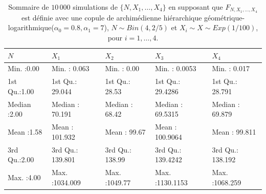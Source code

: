 \documentclass{article}
\begin{document}
	\begin{table}[H]
		\centering
		\begin{tabular}{lllll}
			\hline
			       $N$ &       $X_1$ &       $X_2$ &       $X_3$ &       $X_4$ \\ 
			\hline
			 Min.   :0.00   & Min.   :   0.063   & Min.   :   0.00   & Min.   :   0.0053   & Min.   :   0.017   \\ 
			 1st Qu.:1.00   & 1st Qu.:  29.044   & 1st Qu.:  28.53   & 1st Qu.:  29.4286   & 1st Qu.:  28.791   \\ 
			 Median :2.00   & Median :  70.191   & Median :  68.42   & Median :  69.5315   & Median :  69.879   \\ 
			 Mean   :1.58   & Mean   : 101.932   & Mean   :  99.67   & Mean   : 100.9064   & Mean   :  99.811   \\ 
			 3rd Qu.:2.00   & 3rd Qu.: 139.801   & 3rd Qu.: 138.99   & 3rd Qu.: 139.4242   & 3rd Qu.: 138.192   \\ 
			 Max.   :4.00   & Max.   :1034.009   & Max.   :1049.77   & Max.   :1130.1153   & Max.   :1068.259   \\ 
			\hline
		\end{tabular}
		\caption[Sommaire des données simulées pour le scénario \ref{scenario_geo_log}]{Sommaire de $10\,000$ simulations de $\{N, X_1, \dots, X_4\}$ en supposant que $F_{N,X_1,\dots, X_4}$ est définie avec une copule de archimédienne hiérarchique géométrique-logarithmique($\alpha_0=0.8, \alpha_1 = 7$), $N \sim Bin(4, 2/5)$ et $X_i \sim X \sim Exp(1/100)$, pour $i=1,\dots, 4$.}
		\label{tbl_sommaire_geo_log}
	\end{table}
	
\end{document}
